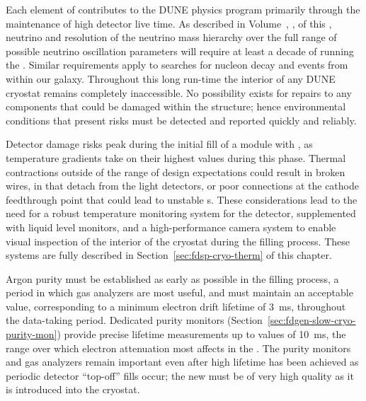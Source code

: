 Each element of  contributes to the DUNE physics program primarily through the maintenance of high detector live time.  As described in Volume~\volnumberphysics{}, \voltitlephysics{}, of this , neutrino  and resolution of the neutrino mass hierarchy over the full range of possible neutrino oscillation parameters will require at least a decade of running the .  Similar requirements apply to searches for nucleon decay and  events from within our galaxy.  Throughout this long run-time the interior of any DUNE cryostat remains completely inaccessible.  No possibility exists for repairs to any components that could be damaged within the  structure; hence environmental conditions that present risks must be detected and reported quickly and reliably. 
 
Detector damage risks peak during the initial fill of a module with , as temperature gradients take on their highest values during this phase.  Thermal contractions outside of the range of design expectations could result in broken  wires,  in  that detach from the  light detectors, or poor connections at the cathode  feedthrough point that could lead to unstable \efield{}s.  These considerations lead to the need for %
a robust temperature monitoring system for the detector, supplemented with liquid level monitors, and a high-performance camera system to enable visual inspection of the interior of the cryostat %
during the filling process.  These systems are fully described in Section~\ref{sec:fdsp-cryo-therm} of this chapter.
 
Argon purity must be established as early as possible in the filling process, a period in which gas analyzers are most useful, and must maintain an acceptable value, corresponding to a minimum electron drift lifetime of \SI{3}{ms}, throughout the data-taking period.  Dedicated  purity monitors (Section~\ref{sec:fdgen-slow-cryo-purity-mon}) 
provide precise lifetime measurements up to values of \SI{10}{ms}, the range over which electron attenuation most affects  in the .  The purity monitors and gas analyzers remain important even after high lifetime has been achieved as periodic detector ``top-off''  fills occur; the new  must be of very high quality as it is introduced into the cryostat.
 

